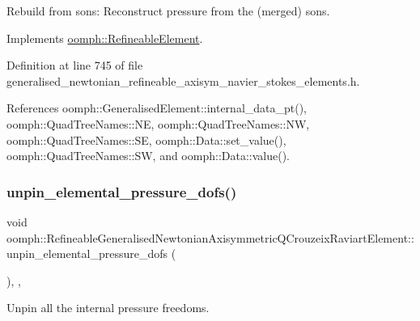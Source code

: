 Rebuild from sons\+: Reconstruct pressure from the (merged) sons. 



Implements \hyperlink{classoomph_1_1RefineableElement_a33324be27833fa4b78279d17158215fa}{oomph\+::\+Refineable\+Element}.



Definition at line 745 of file generalised\+\_\+newtonian\+\_\+refineable\+\_\+axisym\+\_\+navier\+\_\+stokes\+\_\+elements.\+h.



References oomph\+::\+Generalised\+Element\+::internal\+\_\+data\+\_\+pt(), oomph\+::\+Quad\+Tree\+Names\+::\+NE, oomph\+::\+Quad\+Tree\+Names\+::\+NW, oomph\+::\+Quad\+Tree\+Names\+::\+SE, oomph\+::\+Data\+::set\+\_\+value(), oomph\+::\+Quad\+Tree\+Names\+::\+SW, and oomph\+::\+Data\+::value().

\mbox{\label{classoomph_1_1RefineableGeneralisedNewtonianAxisymmetricQCrouzeixRaviartElement_af2bed6ea40d0520dc570b62b3fd81b7d}} 
\subsubsection{\texorpdfstring{unpin\+\_\+elemental\+\_\+pressure\+\_\+dofs()}{unpin\_elemental\_pressure\_dofs()}}
{\footnotesize\ttfamily void oomph\+::\+Refineable\+Generalised\+Newtonian\+Axisymmetric\+Q\+Crouzeix\+Raviart\+Element\+::unpin\+\_\+elemental\+\_\+pressure\+\_\+dofs (\begin{DoxyParamCaption}{ }\end{DoxyParamCaption})\hspace{0.3cm}{\ttfamily [inline]}, {\ttfamily [private]}, {\ttfamily [virtual]}}



Unpin all the internal pressure freedoms. 



